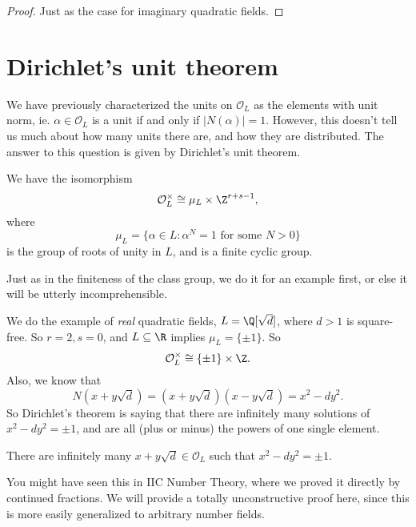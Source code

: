 \documentclass[a4paper]{article}
\begin{document}
\begin{proof}
  Just as the case for imaginary quadratic fields.
\end{proof}

\section{Dirichlet's unit theorem}
We have previously characterized the units on $\mathcal{O}_L$ as the elements with unit norm, ie. $\alpha \in \mathcal{O}_L$ is a unit if and only if $|N(\alpha)| = 1$. However, this doesn't tell us much about how many units there are, and how they are distributed. The answer to this question is given by Dirichlet's unit theorem.

\begin{thm}
  We have the isomorphism
  \[
    \mathcal{O}_L^\times \cong \mu_L \times \Z^{r + s - 1},
  \]
  where
  \[
    \mu_L = \{\alpha \in L: \alpha^N = 1\text{ for some }N > 0\}
  \]
  is the group of roots of unity in $L$, and is a finite cyclic group.
\end{thm}

Just as in the finiteness of the class group, we do it for an example first, or else it will be utterly incomprehensible.

We do the example of \emph{real} quadratic fields, $L = \Q[\sqrt{d}]$, where $d > 1$ is square-free. So $r = 2, s = 0$, and $L \subseteq \R$ implies $\mu_L = \{\pm 1\}$. So
\[
  \mathcal{O}_L^\times \cong \{\pm 1\} \times \Z.
\]
Also, we know that
\[
  N(x + y\sqrt{d}) = (x + y\sqrt{d})(x - y\sqrt{d}) = x^2 - dy^2.
\]
So Dirichlet's theorem is saying that there are infinitely many solutions of $x^2 - dy^2 = \pm 1$, and are all (plus or minus) the powers of one single element.

\begin{thm}
  There are infinitely many $x + y\sqrt{d} \in \mathcal{O}_L$ such that $x^2 - dy^2 = \pm 1$.
\end{thm}
You might have seen this in IIC Number Theory, where we proved it directly by continued fractions. We will provide a totally unconstructive proof here, since this is more easily generalized to arbitrary number fields.
\end{document}
